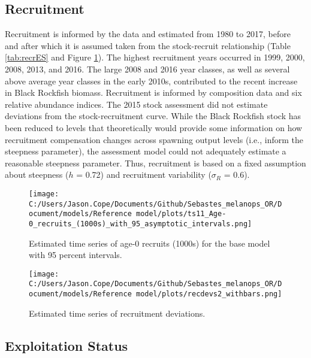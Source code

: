 \documentclass[11pt,
  english,
  letterpaper,
]{article}
\begin{document}
\clearpage

\hypertarget{recruitment}{%
\subsection*{Recruitment}\label{recruitment}}

Recruitment is informed by the data and estimated from 1980 to 2017, before and after which it is assumed taken from the stock-recruit relationship (Table \ref{tab:recrES} and Figure \ref{fig:es-recruits}). The highest recruitment years occurred in 1999, 2000, 2008, 2013, and 2016. The large 2008 and 2016 year classes, as well as several above average year classes in the early 2010s, contributed to the recent increase in Black Rockfish biomass. Recruitment is informed by composition data and six relative abundance indices. The 2015 stock assessment did not estimate deviations from the stock-recruitment curve. While the Black Rockfish stock has been reduced to levels that theoretically would provide some information on how recruitment compensation changes across spawning output levels (i.e., inform the steepness parameter), the assessment model could not adequately estimate a reasonable steepness parameter. Thus, recruitment is based on a fixed assumption about steepness (\(h\) = 0.72) and recruitment variability (\(\sigma_R\) = 0.6).



\begin{figure}
\centering
\texttt{[image: C:/Users/Jason.Cope/Documents/Github/Sebastes\_melanops\_OR/Document/models/Reference model/plots/ts11\_Age-0\_recruits\_(1000s)\_with\_95\_asymptotic\_intervals.png]}
\caption{Estimated time series of age-0 recruits (1000s) for the base model with 95 percent intervals.\label{fig:es-recruits}}
\end{figure}

\begin{figure}
\centering
\texttt{[image: C:/Users/Jason.Cope/Documents/Github/Sebastes\_melanops\_OR/Document/models/Reference model/plots/recdevs2\_withbars.png]}
\caption{Estimated time series of recruitment deviations.\label{fig:es-recdev}}
\end{figure}

\hypertarget{exploitation-status}{%
\subsection*{Exploitation Status}\label{exploitation-status}}
\end{document}
